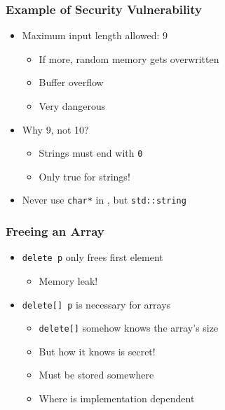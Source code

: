 \begin{frame}
  \frametitle{Example of Security Vulnerability}
  \begin{itemize}
    \item Maximum input length allowed: 9
          \begin{itemize}
            \item If more, random memory gets overwritten
            \item Buffer overflow
            \item Very dangerous
          \end{itemize}
    \item Why 9, not 10?
          \begin{itemize}
            \item Strings must end with \texttt{0}
            \item Only true for strings!
          \end{itemize}
    \item Never use \texttt{char*} in \cpp, but \texttt{std::string}
  \end{itemize}
\end{frame}

\begin{frame}
  \frametitle{Freeing an Array}
  \begin{itemize}
    \item \texttt{delete p} only frees first element
          \begin{itemize}
            \item Memory leak!
          \end{itemize}
    \item \texttt{delete[] p} is necessary for arrays
          \begin{itemize}
            \item \texttt{delete[]} somehow knows the array's size
            \item But how it knows is secret!
            \item Must be stored somewhere
            \item Where is implementation dependent
          \end{itemize}
  \end{itemize}
\end{frame}

